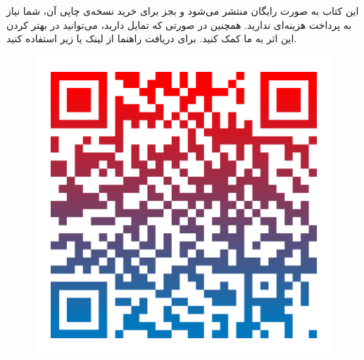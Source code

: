 {\begin{spacing}{1.5}
        این کتاب به صورت رایگان منتشر می‌شود و بجز برای خرید نسخه‌ی چاپی آن، شما نیاز به پرداخت هزینه‌ای ندارید.
        همچنین در صورتی که تمایل دارید، می‌توانید در بهتر کردن این اثر به ما کمک کنید. برای دریافت راهنما از لینک یا  زیر استفاده کنید.

        \begin{figure}[H]
            \centering
            \Large
            \setlength{\belowcaptionskip}{-10pt}
            \includegraphics[scale=0.15]{Images/2/2.BeforeIntro.1.2.png}
            \caption*{\Large {}}
        \end{figure}
    \end{spacing}
}

\newpage